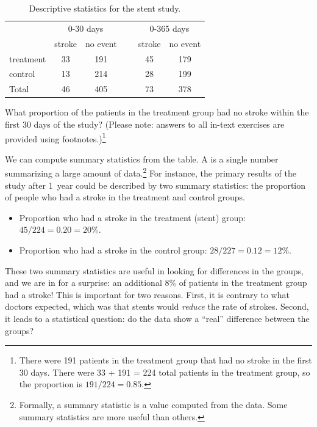 \begin{table}[h]
\centering
\begin{tabular}{l cc c cc}
& \multicolumn{2}{c}{0-30 days} &\hspace{5mm}\ & \multicolumn{2}{c}{0-365 days} \\
  \cline{2-3} \cline{5-6}
	& 	stroke 	& no event && 	stroke 	& no event \\
  \hline
treatment 	& 33		& 191	&&	45 	& 179 \\
control 		& 13		& 214	&& 	28	& 199 \\
  \hline
Total				& 46		& 405	&&	73	& 378 \\
  \hline
\end{tabular}
\caption{Descriptive statistics for the stent study.}
\label{stentStudyResults}
\end{table}

\begin{exercise}
What proportion of the patients in the treatment group had no stroke within the first 30 days of the study? (Please note: answers to all in-text exercises are provided using footnotes.)\footnote{There were 191 patients in the treatment group that had no stroke in the first 30 days. There were 33 + 191 = 224 total patients in the treatment group, so the proportion is $191 / 224 = 0.85$.}
\end{exercise}

We can compute summary statistics from the table. A  is a single number summarizing a large amount of data.\footnote{Formally, a summary statistic is a value computed from the data. Some summary statistics are more useful than others.} For instance, the primary results of the study after 1~year could be described by two summary statistics: the proportion of people who had a stroke in the treatment and control groups.
\begin{itemize}
\setlength{\itemsep}{0mm}
\item[] Proportion who had a stroke in the treatment (stent) group: $45/224 = 0.20 = 20\%$.
\item[] Proportion who had a stroke in the control group: $28/227 = 0.12 = 12\%$.
\end{itemize}
These two summary statistics are useful in looking for differences in the groups, and we are in for a surprise: an additional 8\% of patients in the treatment group had a stroke! This is important for two reasons. First, it is contrary to what doctors expected, which was that stents would \emph{reduce} the rate of strokes. Second, it leads to a statistical question: do the data show a ``real'' difference between the groups?

